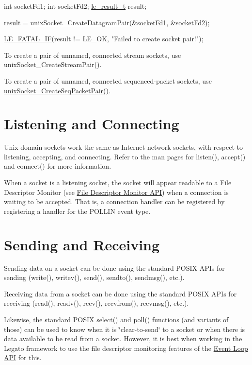 \begin{DoxyCode}
\textcolor{keywordtype}{int} socketFd1;
\textcolor{keywordtype}{int} socketFd2;
\hyperlink{le__basics_8h_a1cca095ed6ebab24b57a636382a6c86c}{le\_result\_t} result;

result = \hyperlink{unix_socket_8h_a662207caa2695a24ff5abdbd82342a66}{unixSocket\_CreateDatagramPair}(&socketFd1, &socketFd2);

\hyperlink{le__log_8h_a7a3e66a87026cc9e57bcb748840ab41b}{LE\_FATAL\_IF}(result != LE\_OK, \textcolor{stringliteral}{"Failed to create socket pair!"});
\end{DoxyCode}


To create a pair of unnamed, connected stream sockets, use unix\+Socket\+\_\+\+Create\+Stream\+Pair().

To create a pair of unnamed, connected sequenced-\/packet sockets, use \hyperlink{unix_socket_8h_a9eb8d8b2e6802827529abf2ad90f6ff6}{unix\+Socket\+\_\+\+Create\+Seq\+Packet\+Pair()}.\hypertarget{c_unixSockets_c_unixSocketsConnecting}{}\section{Listening and Connecting}\label{c_unixSockets_c_unixSocketsConnecting}
Unix domain sockets work the same as Internet network sockets, with respect to listening, accepting, and connecting. Refer to the man pages for listen(), accept() and connect() for more information.

When a socket is a listening socket, the socket will appear readable to a File Descriptor Monitor (see \hyperlink{c_fdMonitor}{File Descriptor Monitor A\+PI}) when a connection is waiting to be accepted. That is, a connection handler can be registered by registering a handler for the {\ttfamily P\+O\+L\+L\+IN} event type.\hypertarget{c_unixSockets_c_unixSocketsSendingAndReceiving}{}\section{Sending and Receiving}\label{c_unixSockets_c_unixSocketsSendingAndReceiving}
Sending data on a socket can be done using the standard P\+O\+S\+IX A\+P\+Is for sending (write(), writev(), send(), sendto(), sendmsg(), etc.).

Receiving data from a socket can be done using the standard P\+O\+S\+IX A\+P\+Is for receiving (read(), readv(), recv(), recvfrom(), recvmsg(), etc.).

Likewise, the standard P\+O\+S\+IX select() and poll() functions (and variants of those) can be used to know when it is \char`\"{}clear-\/to-\/send\char`\"{} to a socket or when there is data available to be read from a socket. However, it is best when working in the Legato framework to use the file descriptor monitoring features of the \hyperlink{c_eventLoop}{Event Loop A\+PI} for this.

